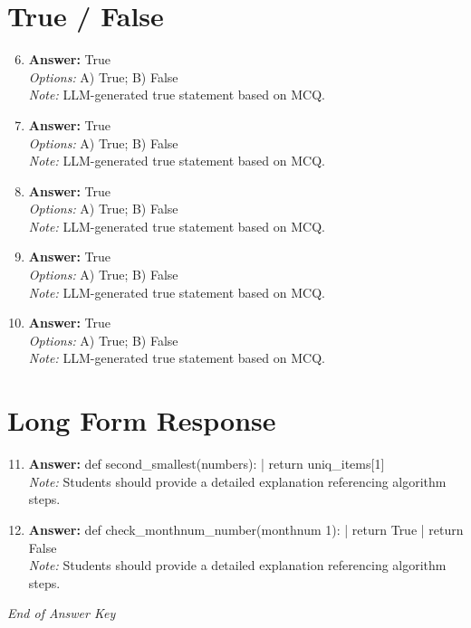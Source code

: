 \documentclass[12pt]{article}
\begin{document}
\section*{True / False}
\begin{enumerate}[label=\arabic*.]
\setcounter{enumi}{5}
\item \textbf{Answer:} True
\\ \textit{Options:} A) True; B) False
\\ \textit{Note:} LLM-generated true statement based on MCQ.
\item \textbf{Answer:} True
\\ \textit{Options:} A) True; B) False
\\ \textit{Note:} LLM-generated true statement based on MCQ.
\item \textbf{Answer:} True
\\ \textit{Options:} A) True; B) False
\\ \textit{Note:} LLM-generated true statement based on MCQ.
\item \textbf{Answer:} True
\\ \textit{Options:} A) True; B) False
\\ \textit{Note:} LLM-generated true statement based on MCQ.
\item \textbf{Answer:} True
\\ \textit{Options:} A) True; B) False
\\ \textit{Note:} LLM-generated true statement based on MCQ.
\end{enumerate}

\section*{Long Form Response}
\begin{enumerate}[label=\arabic*.]
\setcounter{enumi}{10}
\item \textbf{Answer:} def second\_smallest(numbers): | return uniq\_items[1]
\\ \textit{Note:} Students should provide a detailed explanation referencing algorithm steps.
\item \textbf{Answer:} def check\_monthnum\_number(monthnum 1): | return True | return False
\\ \textit{Note:} Students should provide a detailed explanation referencing algorithm steps.
\end{enumerate}

\vfill
\noindent\textit{End of Answer Key}
\end{document}
